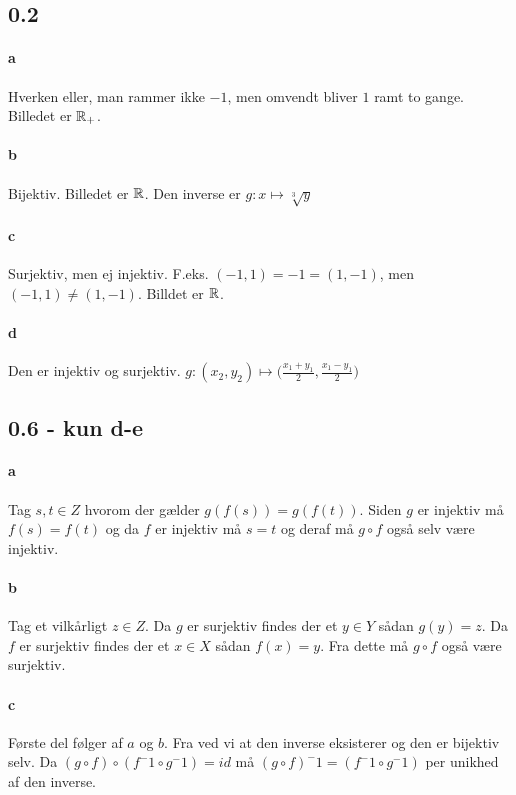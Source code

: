 		\subsection{0.2} 

			\paragraph{a} Hverken eller, man rammer ikke $-1$, men omvendt bliver $1$ ramt to gange. Billedet er $\mathbb{R}_+$.

			\paragraph{b} Bijektiv. Billedet er $\mathbb{R}$. Den inverse er $g:x\mapsto \sqrt[3]{y}$

			\paragraph{c} Surjektiv, men ej injektiv. F.eks. $(-1,1)=-1=(1,-1)$, men $(-1,1)\neq (1,-1)$. Billdet er $\mathbb{R}$.

			\paragraph{d} Den er injektiv og surjektiv. $g:(x_2,y_2)\mapsto \big(\frac{x_1+y_1}{2},\frac{x_1-y_1}{2}\big)$

		\subsection{0.6 - kun d-e} 

			\paragraph{a} Tag $s,t\in Z$ hvorom der gælder $g(f(s))=g(f(t))$. Siden $g$ er injektiv må $f(s)=f(t)$ og da $f$ er injektiv må $s=t$ og deraf må $g \circ f$ også selv være injektiv.

			\paragraph{b} Tag et vilkårligt $z\in Z$. Da $g$ er surjektiv findes der et $y\in Y$ sådan $g(y)=z$. Da $f$ er surjektiv findes der et $x\in X$ sådan $f(x)=y$. Fra dette må $g \circ f$ også være surjektiv.

			\paragraph{c} Første del følger af $a$ og $b$. Fra \cite[Lemma 0.1.3]{hesselholt2017} ved vi at den inverse eksisterer og den er bijektiv selv. Da $(g \circ f) \circ (f^-1 \circ g^-1)=id$ må $(g \circ f)^-1=(f^-1 \circ g^-1)$ per unikhed af den inverse.


